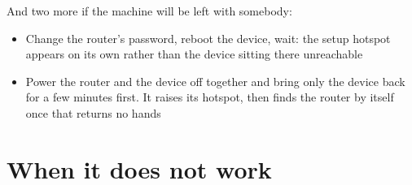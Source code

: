 \documentclass[11pt,a4paper]{article}
\begin{document}
\vspace{2mm}
\noindent And two more if the machine will be left with somebody:

\begin{itemize}[leftmargin=*, label=\chk, itemsep=0.55ex, topsep=0.4ex]
\item Change the router's password, reboot the device, wait: the setup hotspot
      appears on its own rather than the device sitting there unreachable
\item Power the router and the device off together and bring only the device
      back for a few minutes first. It raises its hotspot, then finds the router
      by itself once that returns \textemdash{} no hands
\end{itemize}

\clearpage

\section{When it does not work}
\end{document}
